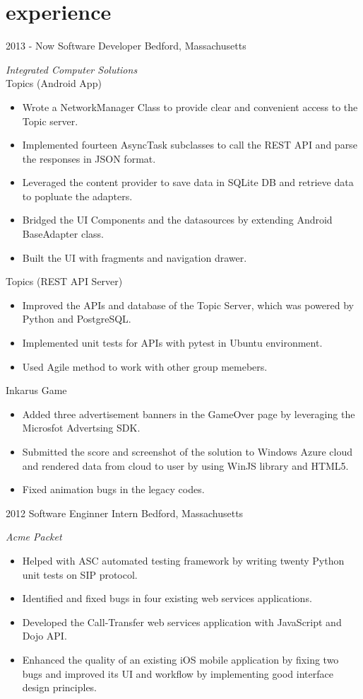\documentclass[]{ly-cv} %
\begin{document}
\section{experience}
\begin{entrylist}
\entry
{2013 - Now}
{Software Developer}
{Bedford, Massachusetts}
{\emph{Integrated Computer Solutions}\vspace{1mm}\\
Topics (Android App)
\begin{itemize}
  \item Wrote a NetworkManager Class to provide clear and convenient access to the Topic server.
  \item Implemented fourteen AsyncTask subclasses to call the REST API and parse the responses in JSON format.
  \item Leveraged the content provider to save data in SQLite DB and retrieve data to popluate the adapters.
  \item Bridged the UI Components and the datasources by extending Android BaseAdapter class.
  \item Built the UI with fragments and navigation drawer.
\end{itemize}
Topics (REST API Server)
\begin{itemize}
  \item Improved the APIs and database of the Topic Server, which was powered by Python and PostgreSQL.
  \item Implemented unit tests for APIs with pytest in Ubuntu environment.
  \item Used Agile method to work with other group memebers.
\end{itemize}
Inkarus Game
\begin{itemize}
  \item Added three advertisement banners in the GameOver page by leveraging the Microsfot Advertsing SDK.
  \item Submitted the score and screenshot of the solution to Windows Azure cloud and rendered data from cloud to user by using WinJS library and HTML5.
  \item Fixed animation bugs in the legacy codes.
\end{itemize}}
\entry
{2012}
{Software Enginner Intern}
{Bedford, Massachusetts}
{\emph{Acme Packet}
\begin{itemize}
  \item Helped with ASC automated testing framework by writing twenty Python unit tests on SIP protocol.
	\item Identified and fixed bugs in four existing web services applications.
  \item Developed the Call-Transfer web services application with JavaScript and Dojo API.
  \item Enhanced the quality of an existing iOS mobile application by fixing two bugs and improved its UI and workflow by implementing good interface design principles.
\end{itemize}}
\end{entrylist}
\end{document}
